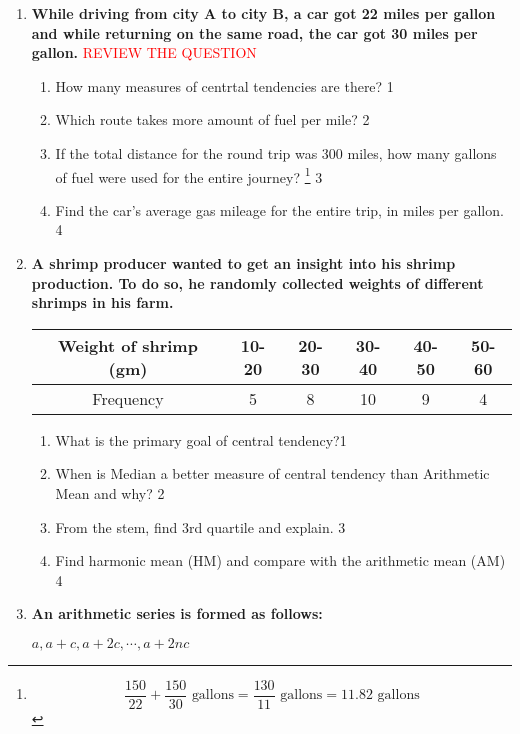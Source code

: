 \documentclass[a4paper,oneside]{book}
\begin{document}
\begin{enumerate}
 \item
	  \textbf{While driving from city A to city B, a car got 22 miles per gallon and
while returning on the same road, the car got 30 miles per gallon.} 
  \textcolor{red}{REVIEW THE QUESTION}
  \begin{enumerate}
    \item
	How many measures of centrtal tendencies are there? \hfill 1
    \item
	Which route takes more amount of fuel per mile? \hfill 2
    \item  
	If the total distance for the round trip was 300 miles, how many gallons of fuel were used for the entire journey? \footnote{$$\frac{150}{22} + \frac{150}{30} \text{ gallons} = \frac{130}{11} \text{ gallons} = 11.82 \text{ gallons}$$} \hfill 3
    \item
	Find the car’s average gas mileage for the entire trip, in miles per gallon. \hfill 4
  \end{enumerate}

     \item
	  \textbf{A shrimp producer wanted to get an insight into his shrimp production. To do so, he randomly collected weights of different shrimps in his farm.} 
	  

	  \begin{table}[h]
	  \centering
\begin{tabular}{c|c|c|c|c|c}
Weight of shrimp (gm) & 10-20 & 20-30 & 30-40 & 40-50 & 50-60 \\ \hline
Frequency & 5 & 8 & 10 & 9 & 4
\end{tabular}
\end{table}

  \begin{enumerate}
    \item
	What is the primary goal of central tendency?\hfill 1
    \item
	When is Median a better measure of central tendency than Arithmetic Mean and why? \hfill 2
    \item  
	From the stem, find 3rd quartile and explain. \hfill 3
    \item
	Find harmonic mean (HM) and compare with the arithmetic mean (AM) \hfill 4
  \end{enumerate}

 \item
	  \textbf{An arithmetic series is formed as follows:}
	  
	   \begin{center}
  \textbf{$a, a+c, a+2c, \cdots, a+2nc$}
  \end{center}
  

\end{enumerate}
\end{document}
